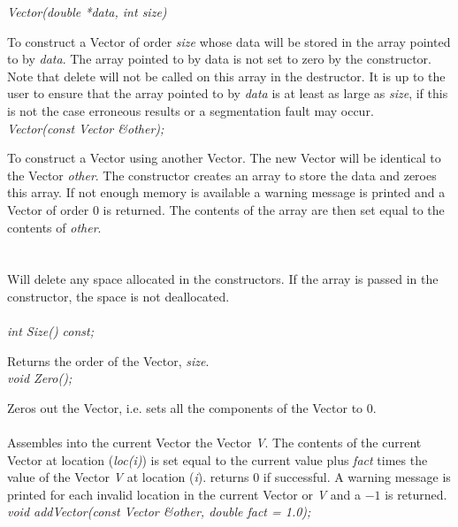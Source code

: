 {\em  Vector(double *data, int size)}  

To construct a Vector of order {\em size} whose data will be stored in the
array pointed to by {\em data}. The array pointed to by data is not set to
zero by the constructor. Note that delete will not be called on this array
in the destructor. It is up to the user to ensure that the array pointed to
by {\em data} is at least as large as {\em size}, if this is not the case
erroneous results or a segmentation fault may occur.\\

{\em  Vector(const Vector \&other); }  

To construct a Vector using another Vector. The new Vector will be
identical to the Vector {\em other}. The constructor creates an array
to store the data and zeroes this array. If not enough memory is available
a warning message is printed and a Vector of order $0$ is returned. The
contents of the array are then set equal to the contents of {\em
other}.\\ 

 \\
\\ 
Will delete any space allocated in the constructors. If the array is
passed in the constructor, the space is not deallocated.\\

  \\
{\em int Size() const;} 

Returns the order of the Vector, {\em size}. \\

{\em void Zero();} 

Zeros out the Vector, i.e. sets all the components of the Vector to
$0$. \\

 \\
Assembles into the current Vector the Vector {\em V}. The contents of the
current Vector at location ({\em loc(i)}) is set equal to the current
value plus {\em fact} times the value of the Vector {\em V} at
location ({\em i}). returns $0$ if successful. A warning message is
printed for each invalid location in the current Vector or {\em V} and a
$-1$ is returned. \\ 

{\em void addVector(const Vector \&other, double fact = 1.0);} 

